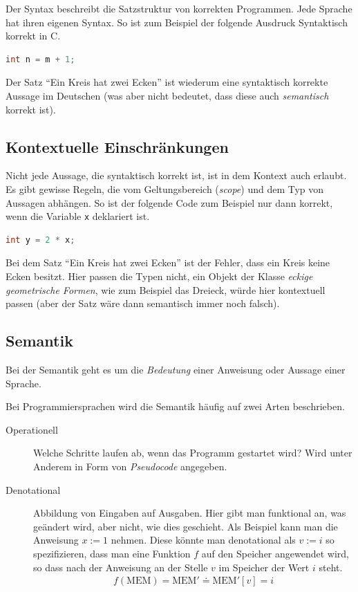 \documentclass[ngerman,abstract=true]{scrartcl}
\begin{document}
Der Syntax beschreibt die Satzstruktur von korrekten Programmen. Jede Sprache hat ihren eigenen Syntax. So ist zum Beispiel der folgende Ausdruck Syntaktisch korrekt in C.
\begin{lstlisting}[language=C]
int n = m + 1;
\end{lstlisting}
Der Satz \enquote{Ein Kreis hat zwei Ecken} ist wiederum eine syntaktisch korrekte Aussage im Deutschen (was aber nicht bedeutet, dass diese auch \emph{semantisch} korrekt ist).

\subsection{Kontextuelle Einschränkungen}

Nicht jede Aussage, die syntaktisch korrekt ist, ist in dem Kontext auch erlaubt. Es gibt gewisse Regeln, die vom Geltungsbereich (\emph{scope}) und dem Typ von Aussagen abhängen. So ist der folgende Code zum Beispiel nur dann korrekt, wenn die Variable \verb|x| deklariert ist.
\begin{lstlisting}[language=C]
int y = 2 * x;
\end{lstlisting}
Bei dem Satz \enquote{Ein Kreis hat zwei Ecken} ist der Fehler, dass ein Kreis keine Ecken besitzt. Hier passen die Typen nicht, ein Objekt der Klasse \emph{eckige geometrische Formen}, wie zum Beispiel das Dreieck, würde hier kontextuell passen (aber der Satz wäre dann semantisch immer noch falsch).

\subsection{Semantik}

Bei der Semantik geht es um die \emph{Bedeutung} einer Anweisung oder Aussage einer Sprache. 

Bei Programmiersprachen wird die Semantik häufig auf zwei Arten beschrieben. 

\begin{description}
\item[Operationell] Welche Schritte laufen ab, wenn das Programm gestartet wird? Wird unter Anderem in Form von \emph{Pseudocode} angegeben.
\item[Denotational] Abbildung von Eingaben auf Ausgaben. Hier gibt man funktional an, was geändert wird, aber nicht, wie dies geschieht. Als Beispiel kann man die Anweisung $ x := 1$ nehmen. Diese könnte man denotational als $v := i$ so spezifizieren, dass man eine Funktion $f$ auf den Speicher angewendet wird, so dass nach der Anweisung an der Stelle $v$ im Speicher der Wert $i$ steht.
\begin{align*}
  f(\mathrm{MEM}) = \mathrm{MEM'} \doteq \mathrm{MEM'}[v] = i
\end{align*}
\end{description}
\end{document}
